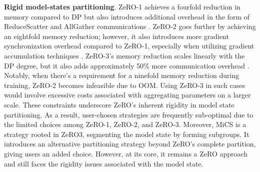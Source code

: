 
\noindent\textbf{Rigid model-states partitioning}. 
ZeRO-1 achieves a fourfold reduction in memory compared to DP but also introduces additional overhead in the form of ReduceScatter and AllGather communications \cite{ZeRO}. ZeRO-2 goes further by achieving an eightfold memory reduction; however, it also introduces more gradient synchronization overhead compared to ZeRO-1, especially when utilizing gradient accumulation techniques \cite{ZeRO++}. ZeRO-3's memory reduction scales linearly with the DP degree, but it also adds approximately 50\% more communication overhead \cite{ZeRO-Infinity, ZeRO++}. Notably, when there's a requirement for a ninefold memory reduction during training, ZeRO-2 becomes infeasible due to OOM. Using ZeRO-3 in such cases would involve excessive costs associated with aggregating parameters on a larger scale. These constraints underscore ZeRO's inherent rigidity in model state partitioning. As a result, user-chosen strategies are frequently sub-optimal due to the limited choices among ZeRO-1, ZeRO-2, and ZeRO-3. Moreover, MiCS \cite{MiCS} is a strategy rooted in ZeRO3, segmenting the model state by forming subgroups. It introduces an alternative partitioning strategy beyond ZeRO's complete partition, giving users an added choice. However, at its core, it remains a ZeRO approach and still faces the rigidity issues associated with the model state.





